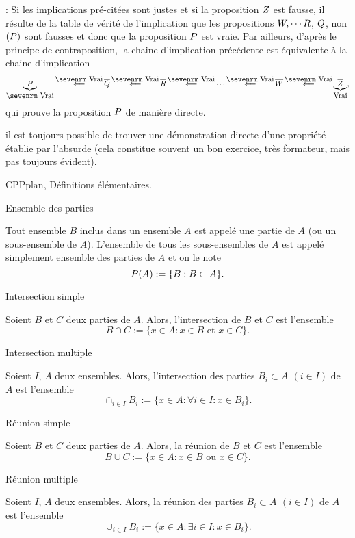 \Remarque : Si les implications pré-citées sont justes et si la proposition $\sc Z$ est fausse, il résulte de la table de vérité de l'implication que les propositions $\sc W,\cdots \sc R$, $\sc Q$, non $(\sc P)$ sont fausses et donc que la proposition $\sc P$ est vraie. 
Par ailleurs, d'après le principe de contraposition, la chaine d'implication précédente est équivalente à la chaine d'implication 
$$
\underbrace{\sc P}_{\mbox{\sevenrm Vrai}}\mathop{\Longleftarrow}\limits^{\mbox{\sevenrm Vrai}}
\overline{\sc Q}\mathop{\Longleftarrow}\limits^{\mbox{\sevenrm Vrai}}\overline{\sc R}
\mathop{\Longleftarrow}\limits^{\mbox{\sevenrm Vrai}}\cdots
\mathop{\Longleftarrow}\limits^{\mbox{\sevenrm Vrai}}\overline{\sc W}
\mathop{\Longleftarrow}\limits^{\mbox{\sevenrm Vrai}}
\underbrace{\overline{\sc Z}}_{\mbox{Vrai}},
$$
qui prouve la proposition $\sc P$ de manière directe. 

 il est toujours possible de trouver une démonstration directe d'une propriété établie par l'absurde (cela constitue souvent un bon exercice, très formateur, mais pas toujours évident). 
\bigskip

\Section CPPplan, Définitions élémentaires. 

\Concept Ensemble des parties

Tout ensemble $B$ inclus dans un ensemble $A$ est appelé une partie de $A$ (ou un sous-ensemble de $A$). \pn
L'ensemble de tous les sous-ensembles de $A$ est appelé simplement ensemble des parties de $A$ et on le note
$$
\sc P(A):=\{B:B\subset A\}.
$$

\Concept Intersection simple

Soient $B$ et $C$ deux parties de $A$. Alors, l'intersection de $B$ et $C$ est l'ensemble
$$
B\cap C:=\{x\in A:x\in B \mbox{ et }x\in C\}.
$$

\Concept Intersection multiple

Soient $I$, $A$ deux ensembles. Alors, l'intersection des parties $B_i\subset A\ \,(i\in I)$ de $A$ est l'ensemble 
$$
\cap_{i\in I}B_i:=\{x\in A:\forall i\in I:x\in B_i\}.
$$ 


\Concept Réunion simple

Soient $B$ et $C$ deux parties de $A$. Alors, la réunion de $B$ et $C$ est l'ensemble 
$$
B\cup C:=\{x\in A:x\in B \mbox{ ou }x\in C\}.
$$

\Concept Réunion multiple

Soient $I$, $A$ deux ensembles. Alors, la réunion des parties $B_i\subset A\ \,(i\in I)$ de $A$ est l'ensemble 
$$
\cup_{i\in I}B_i:=\{x\in A:\exists i\in I:x\in B_i\}.
$$ 

